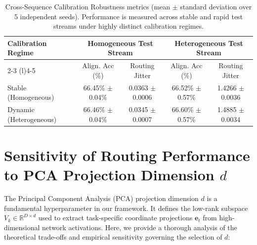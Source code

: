 \documentclass{article}
\theoremstyle{plain}
\theoremstyle{definition}
\theoremstyle{remark}
\begin{document}
\begin{table}[h]
\caption{Cross-Sequence Calibration Robustness metrics (mean $\pm$ standard deviation over 5 independent seeds). Performance is measured across stable and rapid test streams under highly distinct calibration regimes.}
\label{tab:cross_calibration}
\vskip 0.1in
\begin{center}
\begin{small}
\begin{sc}
\begin{tabular}{lcccc}
\toprule
Calibration Regime & \multicolumn{2}{c}{Homogeneous Test Stream} & \multicolumn{2}{c}{Heterogeneous Test Stream} \\
\cmidrule(r){2-3} \cmidrule(l){4-5}
& Align. Acc (\%) & Routing Jitter & Align. Acc (\%) & Routing Jitter \\
\midrule
Stable (Homogeneous) & 66.45\% $\pm$ 0.04\% & 0.0363 $\pm$ 0.0006 & 66.52\% $\pm$ 0.57\% & 1.4266 $\pm$ 0.0036 \\
Dynamic (Heterogeneous) & 66.46\% $\pm$ 0.04\% & 0.0345 $\pm$ 0.0007 & 66.60\% $\pm$ 0.57\% & 1.4885 $\pm$ 0.0034 \\
\bottomrule
\end{tabular}
\end{sc}
\end{small}
\end{center}
\end{table}


\section{Sensitivity of Routing Performance to PCA Projection Dimension $d$}
\label{app:pca_sensitivity}

The Principal Component Analysis (PCA) projection dimension $d$ is a fundamental hyperparameter in our framework. It defines the low-rank subspace $V_k \in \mathbb{R}^{D \times d}$ used to extract task-specific coordinate projections $\mathbf{e}_t$ from high-dimensional network activations. Here, we provide a thorough analysis of the theoretical trade-offs and empirical sensitivity governing the selection of $d$:
\end{document}
